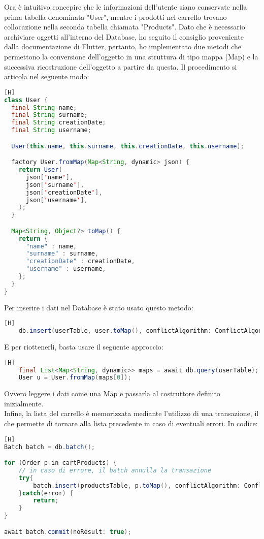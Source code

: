 \noindent
Ora è intuitivo concepire che le informazioni dell'utente siano conservate nella prima tabella denominata "User", mentre i prodotti nel carrello trovano collocazione nella seconda tabella chiamata "Products". Dato che è necessario archiviare oggetti all'interno del Database, ho seguito il consiglio proveniente dalla documentazione di Flutter, pertanto, ho implementato due metodi che permettono la conversione dell'oggetto in una struttura di tipo mappa (Map) e la successiva ricostruzione dell'oggetto a partire da questa. Il procedimento si articola nel seguente modo:
\newpage
\begin{lstlisting}[language=Java, firstnumber=1][H]
class User {
  final String name;
  final String surname;
  final String creationDate;
  final String username;

  User(this.name, this.surname, this.creationDate, this.username);

  factory User.fromMap(Map<String, dynamic> json) {
    return User(
      json['name'],
      json['surname'],
      json['creationDate'],
      json['username'],
    );
  }

  Map<String, Object?> toMap() {
    return {
      "name" : name,
      "surname" : surname,
      "creationDate" : creationDate,
      "username" : username,
    };
  }
}
\end{lstlisting}

\noindent
Per inserire i dati nel Database è stato usato questo metodo:
\begin{lstlisting}[language=Java, style=longBlock, firstnumber=1][H]
	db.insert(userTable, user.toMap(), conflictAlgorithm: ConflictAlgorithm.replace);
\end{lstlisting}

\noindent
E per riottenerli, basta usare il seguente approccio:
\begin{lstlisting}[language=java, style=longBlock, firstnumber=1][H]
    final List<Map<String, dynamic>> maps = await db.query(userTable);
    User u = User.fromMap(maps[0]);
\end{lstlisting}

\noindent
Ovvero leggere i dati come una Map e passarla al costruttore definito inizialmente.\\
Infine, la lista del carrello è memorizzata mediante l'utilizzo di una transazione, il che permette di tornare alla lista precedente in caso di eventuali errori. In codice:
\begin{lstlisting}[language=Java, firstnumber=1][H]
Batch batch = db.batch();

for (Order p in cartProducts) {
	// in caso di errore, il batch annulla la transazione
	try{
		batch.insert(productsTable, p.toMap(), conflictAlgorithm: ConflictAlgorithm.replace);
	}catch(error) {
		return;
	}
}

await batch.commit(noResult: true);	
\end{lstlisting}

